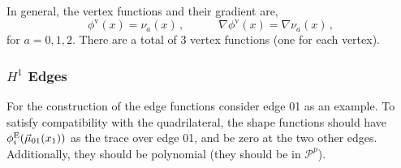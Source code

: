 In general, the vertex functions and their gradient are,
\begin{equation}
    \phi^\mathrm{v}(x)=\nu_a(x)\,,\qquad\quad\nabla\phi^\mathrm{v}(x)=\nabla\nu_a(x)\,,
\end{equation}
for $a=0,1,2$.
There are a total of $3$ vertex functions (one for each vertex).
%
%

\subsubsection{\texorpdfstring{$H^1$}{H1} Edges}
\label{sec:H1edgesTri}

For the construction of the edge functions consider edge 01 as an example.
To satisfy compatibility with the quadrilateral, the shape functions should have $\phi_i^{\mathrm{E}}(\vec{\mu}_{01}(x_1))$ as the trace over edge 01, and be zero at the two other edges.
Additionally, they should be polynomial (they should be in $\mathcal{P}^p$).

